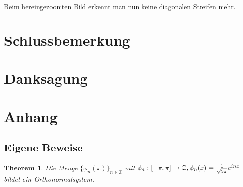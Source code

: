 \documentclass[a4paper,12pt]{article}
\newtheorem{theorem}{Theorem}[section]
\theoremstyle{definition}
\theoremstyle{remark}
\begin{document}
Beim hereingezoomten Bild erkennt man nun keine diagonalen Streifen mehr. 

\section{Schlussbemerkung}
\section{Danksagung}

\section{Anhang}
        
\subsection{Eigene Beweise}
\begin{theorem}\label{thm:orthonorm}
Die Menge $\{\phi_n(x)\}_{n\in\mathbb{Z}}$ mit $\phi_n:[-\pi, \pi] \to \mathbb{C}, \\ \phi_n(x) = \frac{1}{\sqrt{2\pi}}e^{inx}$ bildet ein Orthonormalsystem.
\end{theorem}
        
\end{document}

